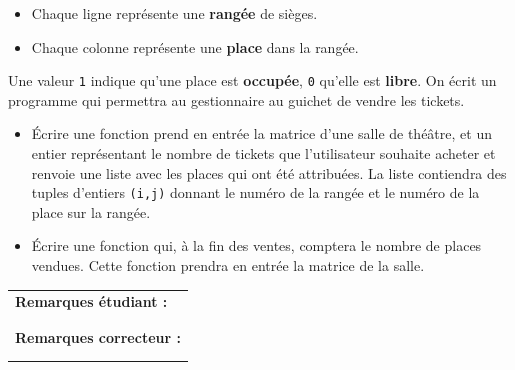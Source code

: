 \documentclass[a4paper,11pt]{article}
\begin{document}
\begin{itemize}
\item Chaque ligne représente une \textbf{rangée} de sièges.  
\item Chaque colonne représente une \textbf{place} dans la rangée.  
\end{itemize}
Une valeur \texttt{1} indique qu'une place est \textbf{occupée}, \texttt{0} qu'elle est \textbf{libre}.
On écrit un programme qui permettra au gestionnaire au guichet de vendre les tickets. 

\begin{itemize}
\item[1.] \'Ecrire une fonction prend en entrée la matrice d'une salle de théâtre, et un entier représentant le nombre de tickets que l'utilisateur souhaite 
acheter et renvoie une liste avec les places qui ont été attribuées. La liste contiendra des tuples d'entiers \texttt{(i,j)} donnant le numéro de la rangée et le numéro de la place sur la rangée. 
\item[2.] \'Ecrire une fonction qui, à la fin des ventes, comptera le nombre de places vendues. Cette fonction prendra en entrée la matrice de la salle. 
\end{itemize}


\begin{table}[h!]
\centering
\renewcommand{\arraystretch}{1.4} %
\begin{tabular}{|p{15cm}|}
\hline
\textbf{Remarques étudiant :}    \\
 \\
 \\
\hline
\textbf{Remarques correcteur :}  \\
 \\
 \\
\hline
\end{tabular}
\end{table}
\end{document}
